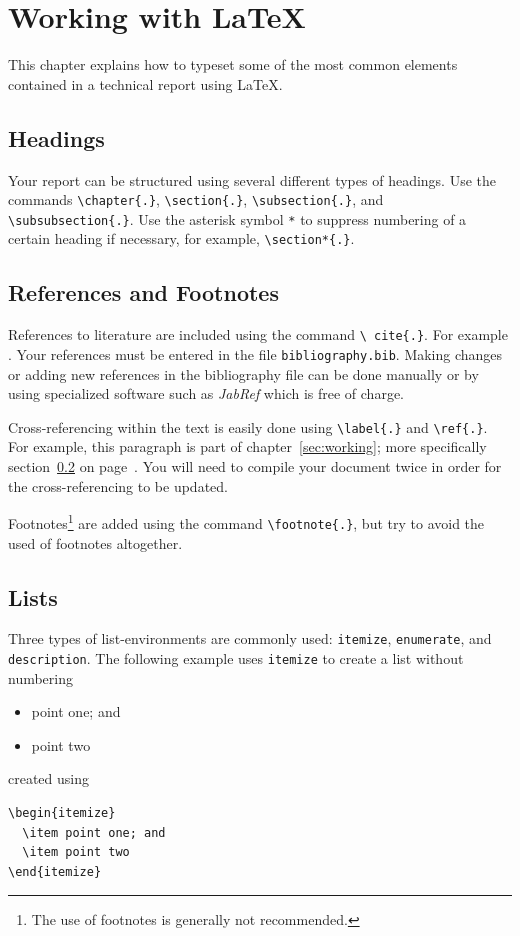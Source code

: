 \chapter*{Working with \LaTeX\ }\label{sec:working}
This chapter explains how to typeset some of the most common elements contained in a technical report using \LaTeX.

\section{Headings}
Your report can be structured using several different types of headings. Use the commands \texttt{\textbackslash chapter\{.\}}, \texttt{\textbackslash section\{.\}}, \texttt{\textbackslash subsection\{.\}}, and \texttt{\textbackslash subsubsection\{.\}}. Use the asterisk symbol \texttt{*} to suppress numbering of a certain heading if necessary, for example, \texttt{\textbackslash section*\{.\}}.

\section{References and Footnotes}\label{sec:references}
References to literature are included using the command \texttt{\textbackslash
cite\{.\}}. For example \cite{optreg,motsys}. Your references must be entered in the file \texttt{bibliography.bib}. Making changes or adding new references in the bibliography file can be done manually or by using specialized software such as \textit{JabRef} which is free of charge.
 
Cross-referencing within the text is easily done using \texttt{\textbackslash label\{.\}} and \texttt{\textbackslash ref\{.\}}. For example, this paragraph is part of chapter~\ref{sec:working}; more specifically section~\ref{sec:references} on page~\pageref{sec:references}. You will need to compile your document twice in order for the cross-referencing to be updated.

Footnotes\footnote{The use of footnotes is generally not recommended.} are added using the command \texttt{\textbackslash footnote\{.\}}, but try to avoid the used of footnotes altogether.

\section{Lists}\label{sec:lists}
Three types of list-environments are commonly used: \texttt{itemize}, \texttt{enumerate}, and \texttt{description}. The following example uses \texttt{itemize} to create a list without numbering
\begin{itemize}
  \item point one; and
  \item point two
\end{itemize}
created using
\begin{verbatim}
\begin{itemize}
  \item point one; and
  \item point two
\end{itemize}
\end{verbatim}

